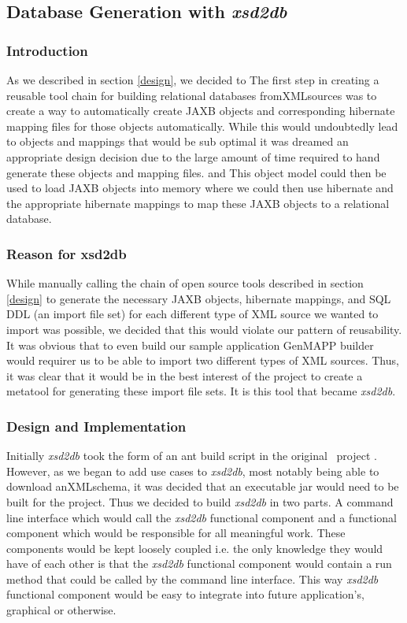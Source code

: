 \subsection{Database Generation with \emph{xsd2db}}
\label{xsd2db}
\subsubsection{Introduction}
As we described in section \ref{design}, we decided to 
The first step in creating a reusable tool chain for building relational databases fromXMLsources was to create a way to automatically create JAXB objects and corresponding hibernate mapping files for those objects automatically.  While this would undoubtedly lead to objects and mappings that would be sub optimal it was dreamed an appropriate design decision due to the large amount of time required to hand generate these objects and mapping files.  and   This object model could then be used to load JAXB objects into memory where we could then use hibernate and the appropriate hibernate mappings to map these JAXB objects to a relational database. 

\subsubsection{Reason for xsd2db}
While manually calling the chain of open source tools described in section \ref{design} to generate the necessary JAXB objects, hibernate mappings, and SQL DDL (an import file set) for each different type of XML source we wanted to import was possible, we decided that this would violate our pattern of reusability.  It was obvious that to even build our sample application GenMAPP builder would requirer us to be able to import two different types of XML sources.   Thus, it was clear that it would be in the best interest of the project to create a metatool for generating these import file sets.  It is this tool that became \emph{xsd2db}.    
\subsubsection{Design and Implementation}
Initially \emph{xsd2db} took the form of an ant build script in the original \xmlpipedb~project \cite{xmlpipedb}.  However, as we began to add use cases to \emph{xsd2db}, most notably being able to download anXMLschema,  it was decided that an executable jar would need to be built for the project.  Thus we decided to build \emph{xsd2db} in two parts.  A command line interface which would call the \emph{xsd2db} functional component and a functional component which would be responsible for all meaningful work.  These components would be kept loosely coupled i.e. the only knowledge they would have of each other is that  the \emph{xsd2db} functional component would contain a run method that could be called by the command line interface.  This way \emph{xsd2db} functional component would be easy to integrate into future application's, graphical or otherwise.   

